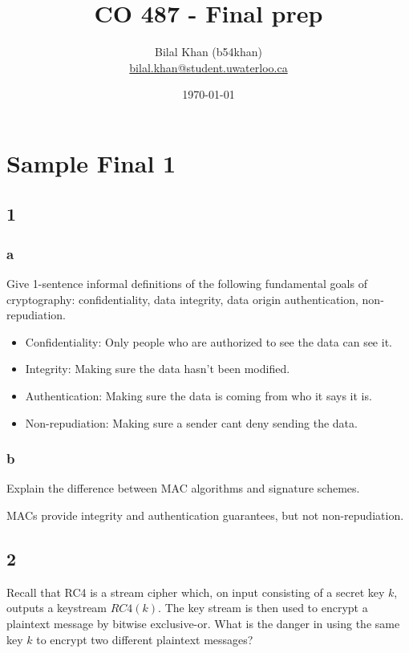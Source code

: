 \documentclass[11pt]{article}
\title{CO 487 - Final prep}
\author{Bilal Khan (b54khan)\\
\href{mailto:bilal.khan@student.uwaterloo.ca}{bilal.khan@student.uwaterloo.ca}}
\date{\today}
\begin{document}
\maketitle

\tableofcontents

\section{Sample Final 1}

\subsection{1}

\subsubsection{a} Give 1-sentence informal definitions of the following fundamental goals of cryptography: conﬁdentiality, data integrity, data origin authentication, non-repudiation.

\begin{itemize}
  \item Confidentiality: Only people who are authorized to see the data can see it.
  \item Integrity: Making sure the data hasn't been modified.
  \item Authentication: Making sure the data is coming from who it says it is.
  \item Non-repudiation: Making sure a sender cant deny sending the data.
\end{itemize}

\subsubsection{b} Explain the diﬀerence between MAC algorithms and signature schemes.

MACs provide integrity and authentication guarantees, but not non-repudiation.

\subsection{2} Recall that RC4 is a stream cipher which, on input consisting of a secret key $k$, outputs a keystream $RC4(k)$. The key stream is then used to encrypt a plaintext message by bitwise exclusive-or. What is the danger in using the same key $k$ to encrypt two different plaintext messages?
\end{document}
